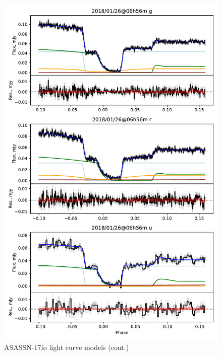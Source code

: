 \begin{figure}
    \centering
    \includegraphics[width=\textwidth]{figures/results/ASASSN-17fo/ASASSN-17fo_3.pdf}
    \caption{ASASSN-17fo light curve models (cont.)}
    \label{fig:ASASSN-17fo all light curves cont 2}
\end{figure}
